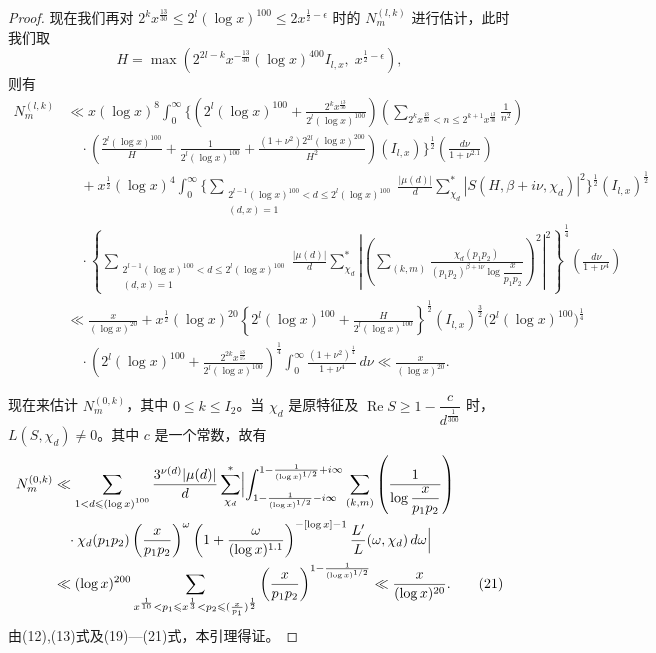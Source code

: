 \begin{proof}
现在我们再对 $2^kx^{\frac{13}{30}}\leqslant2^l(\log x)^{100}\leqslant2x^{\frac12-\epsilon}$ 时的 $N_m^{(l,k)}$ 进行估计，此时我们取
\[
H=\max\left(2^{2l-k}x^{-\frac{13}{30}}(\log x)^{400}I_{l,x},\;x^{\frac12-\epsilon}\right),
\]
则有
\begin{align*}
N_m^{(l,k)}&\ll x(\log x)^8\int_0^{\infty}\Biggl\{\left(2^l(\log x)^{100}+\frac{2^kx^{\frac{13}{30}}}{2^l(\log x)^{100}}\right)\left(\sum_{2^kx^{\frac{13}{30}}<n\leqslant2^{k+1}x^{\frac{13}{30}}}\frac1{n^2}\right)\\
&\quad\cdot\left(\frac{2^l(\log x)^{100}}H+\frac1{2^l(\log x)^{100}}+\frac{(1+\nu^2)2^{2l}(\log x)^{200}}{H^2}\right)(I_{l,x})\Biggr\}^{\frac12}\left(\frac{d\nu}{1+\nu^{2.1}}\right)\\
&\quad+x^{\frac12}(\log x)^4\int_0^{\infty}\Biggl\{\sum_{\substack{2^{l-1}(\log x)^{100}<d\leqslant2^l(\log x)^{100}\\(d,x)=1}}\frac{|\mu(d)|}{d}\sum_{\chi_d}^{*}|S(H,\beta+i\nu,\chi_d)|^2\Biggr\}^{\frac12}(I_{l,x})^{\frac12}\\
&\quad\cdot\left\{\sum_{\substack{2^{l-1}(\log x)^{100}<d\leqslant2^l(\log x)^{100}\\(d,x)=1}}\frac{|\mu(d)|}{d}\sum_{\chi_d}^{*}\left|\left(\sum_{(k,m)}\frac{\chi_d(p_1p_2)}{(p_1p_2)^{\beta+i\nu}\log\dfrac{x}{p_1p_2}}\right)^2\right|^2\right\}^{\frac14}\left(\frac{d\nu}{1+\nu^4}\right)\\
&\ll\frac{x}{(\log x)^{20}}+x^{\frac12}(\log x)^{20}\left\{2^l(\log x)^{100}+\frac{H}{2^l(\log x)^{100}}\right\}^{\frac12}(I_{l,x})^{\frac32}\bigl(2^l(\log x)^{100}\bigr)^{\frac14}\\
&\quad\cdot\left(2^l(\log x)^{100}+\frac{2^{2k}x^{\frac{13}{15}}}{2^l(\log x)^{100}}\right)^{\frac14}\int_0^{\infty}\frac{(1+\nu^2)^{\frac14}}{1+\nu^4}\,d\nu\ll\frac{x}{(\log x)^{20}}.\tag{20}
\end{align*}

现在来估计 $N_m^{(0,k)}$，其中 $0\leqslant k\leqslant I_2$。当 $\chi_d$ 是原特征及 $\operatorname{Re}S\geqslant1-\dfrac{c}{d^{\frac1{300}}}$ 时，$L(S,\chi_d)\neq0$。其中 $c$ 是一个常数，故有
\begin{align*}
N_m^{(0,k)}&\ll\sum_{\substack{1<d\leqslant(\log x)^{100}}}\frac{3^{\nu(d)}|\mu(d)|}{d}\sum_{\chi_d}^{*}\Bigl|\int_{1-\frac1{(\log x)^{1/2}}-i\infty}^{1-\frac1{(\log x)^{1/2}}+i\infty}\sum_{(k,m)}\left(\frac1{\log\dfrac{x}{p_1p_2}}\right)\\
&\quad\cdot\chi_d(p_1p_2)\left(\frac{x}{p_1p_2}\right)^\omega\left(1+\frac{\omega}{(\log x)^{1.1}}\right)^{-[\log x]-1}\frac{L'}{L}(\omega,\chi_d)\,d\omega\Bigr|\\
&\ll(\log x)^{200}\sum_{x^{\frac1{10}}<p_1\leqslant x^{\frac13}<p_2\leqslant(\frac{x}{p_1})^{\frac12}}\left(\frac{x}{p_1p_2}\right)^{1-\frac1{(\log x)^{1/2}}}\ll\frac{x}{(\log x)^{20}}.\tag{21}
\end{align*}
由(12),(13)式及(19)—(21)式，本引理得证。
\end{proof}

